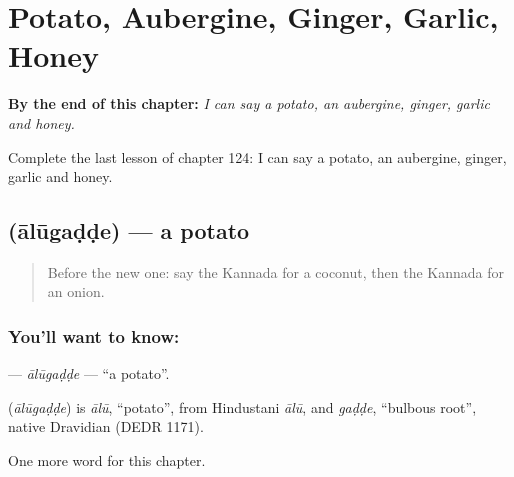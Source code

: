 
\chapter{Potato, Aubergine, Ginger, Garlic, Honey}
\label{ch:ka-potato-aubergine-ginger-garlic-honey}

\begin{chapteropening}
\textbf{By the end of this chapter:} \emph{I can say a potato, an aubergine, ginger, garlic and honey.}

Complete the last lesson of chapter 124: I can say a potato, an aubergine, ginger, garlic and honey.
\end{chapteropening}

\section[\texorpdfstring{\kn{ಆಲೂಗಡ್ಡೆ} (ālūgaḍḍe)}{ಆಲೂಗಡ್ಡೆ (ālūgaḍḍe)}]{ (ālūgaḍḍe) — a potato}

\label{lesson:KA-C124-alugadde}



\begin{quote}
Before the new one: say the Kannada for a coconut, then the Kannada for an onion.
\end{quote}

\subsection*{You'll want to know: }
\textbf{} — \emph{ālūgaḍḍe} — \textquotedblleft{}a potato\textquotedblright{}.

\begin{cousinweb}
\textbf{} (\emph{ālūgaḍḍe}) is \emph{ālū}, \textquotedblleft{}potato\textquotedblright{}, from Hindustani \emph{ālū}, and \emph{gaḍḍe}, \textquotedblleft{}bulbous root\textquotedblright{}, native Dravidian (DEDR 1171).
\end{cousinweb}

\begin{grammarlens}[title={What you've built}]
One more word for this chapter.
\end{grammarlens}

